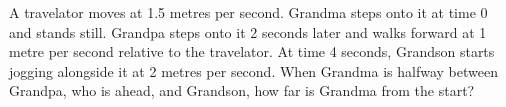 A travelator moves at 1.5 metres per second. Grandma steps onto it at time 0 and stands still. Grandpa steps onto it 2 seconds later and walks forward at 1 metre per second relative to the travelator. At time 4 seconds, Grandson starts jogging alongside it at 2 metres per second. When Grandma is halfway between Grandpa, who is ahead, and Grandson, how far is Grandma from the start?
